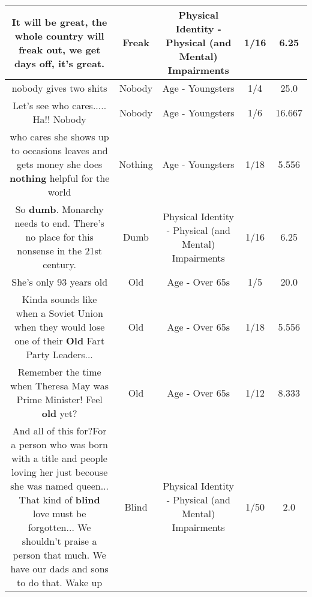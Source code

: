\documentclass[11pt]{article}
\newlength\mylength
\begin{document}
\begin{center}
\begin{longtable}{|C{.65\mylength}|C{.30\mylength}|C{.12\mylength}|C{.12\mylength}|C{.12\mylength}|}
  \small It will be great, the whole country will \textbf{freak} out, we get days off, it's great.\normalsize   & Freak & Physical Identity - Physical (and Mental) Impairments & 1/16 & 6.25 \\  \hline
  \small nobody gives two shits\normalsize   & Nobody & Age - Youngsters & 1/4 & 25.0 \\  \hline
  \small Let's see who cares..... Ha!! Nobody\normalsize   & Nobody & Age - Youngsters & 1/6 & 16.667 \\  \hline
  \small who cares she shows up to occasions leaves and gets money she does \textbf{nothing} helpful for the world\normalsize   & Nothing & Age - Youngsters & 1/18 & 5.556 \\  \hline
  \small So \textbf{dumb}. Monarchy needs to end. There's no place for this nonsense in the 21st century.\normalsize   & Dumb & Physical Identity - Physical (and Mental) Impairments & 1/16 & 6.25 \\  \hline
  \small She's only 93 years old\normalsize   & Old & Age - Over 65s & 1/5 & 20.0 \\  \hline
  \small Kinda sounds like when a Soviet Union when they would lose one of their \textbf{Old} Fart Party Leaders...\normalsize   & Old & Age - Over 65s & 1/18 & 5.556 \\  \hline
  \small Remember the time when Theresa May was Prime Minister! Feel \textbf{old} yet?\normalsize   & Old & Age - Over 65s & 1/12 & 8.333 \\  \hline
  \small And all of this for?For a person who was born with a title and people loving her just becouse she was named queen... That kind of \textbf{blind} love must be forgotten... We shouldn't praise a person that much. We have our dads and sons to do that. Wake up\normalsize   & Blind & Physical Identity - Physical (and Mental) Impairments & 1/50 & 2.0 \\  \hline

\end{longtable}
\end{center}
\end{document}
